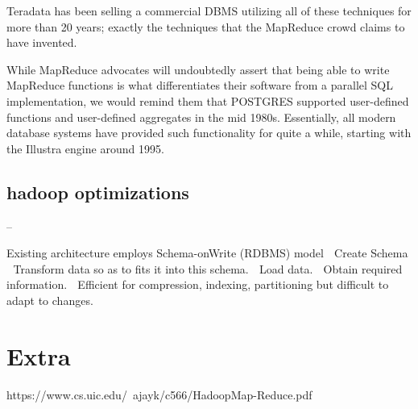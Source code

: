 \documentclass[10pt,twocolumn]{IEEEtran11}
\begin{document}
Teradata has been selling a commercial DBMS utilizing all of these techniques for more than 20 years; exactly the techniques that the MapReduce crowd claims to have invented.   

While MapReduce advocates will undoubtedly assert that being able to write MapReduce functions is what differentiates their software from a parallel SQL implementation, we would remind them that POSTGRES supported user-defined functions and user-defined aggregates in the mid 1980s. Essentially, all modern database systems have provided such functionality for quite a while, starting with the Illustra engine around 1995.  

\subsection{hadoop optimizations}

--











Existing architecture employs Schema-onWrite
(RDBMS) model
 Create Schema
 Transform data so as to fits it into this schema.
 Load data.
 Obtain required information.
 Efficient for compression, indexing,
partitioning but difficult to adapt to changes.

\section{Extra}
https://www.cs.uic.edu/~ajayk/c566/HadoopMap-Reduce.pdf











\end{document}

